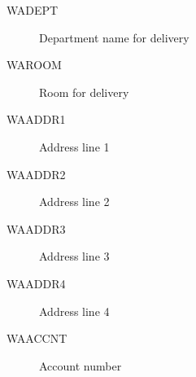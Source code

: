 \documentclass[letterpaper,10pt,english]{sphinxmanual}
\begin{document}
\begin{description}
\begin{description}
\begin{description}
\begin{description}
\item[{WADEPT}] \leavevmode
Department name for delivery

\item[{WAROOM}] \leavevmode
Room for delivery

\item[{WAADDR1}] \leavevmode
Address line 1

\item[{WAADDR2}] \leavevmode
Address line 2

\item[{WAADDR3}] \leavevmode
Address line 3

\item[{WAADDR4}] \leavevmode
Address line 4

\item[{WAACCNT}] \leavevmode
Account number

\end{description}

\end{description}

\end{description}

\end{description}
\end{document}
